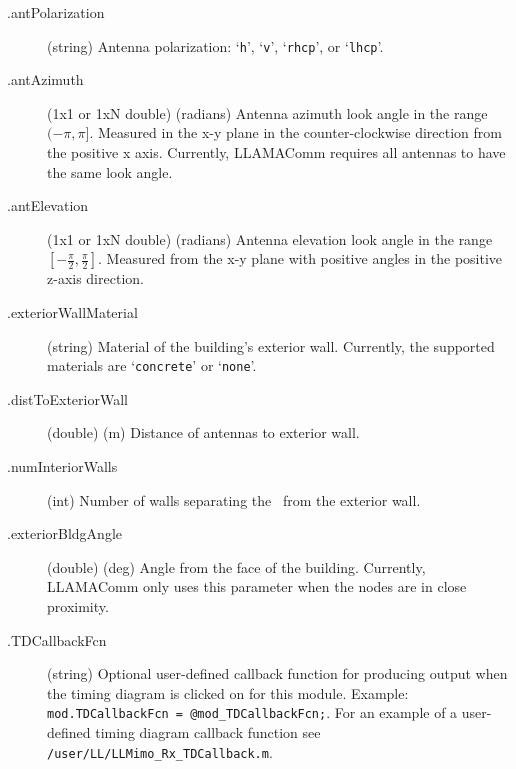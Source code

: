 \begin{description}
\item[.antPolarization] (string) Antenna polarization: `\verb+h+',
`\verb+v+', `\verb+rhcp+', or `\verb+lhcp+'.

\item[.antAzimuth] (1x1 or 1xN double) (radians) Antenna azimuth look angle
in the range $(-\pi, \pi]$. Measured in the x-y plane in the counter-clockwise
direction from the positive x axis.  Currently, LLAMAComm requires all antennas
to have the same look angle.

\item[.antElevation] (1x1 or 1xN double) (radians) Antenna elevation look
angle in the range $[-\frac{\pi}{2}, \frac{\pi}{2}]$.  Measured from the x-y
plane with positive angles in the positive z-axis direction.

\item[.exteriorWallMaterial] (string) Material of the building's exterior
wall.  Currently, the supported materials are `\verb+concrete+' or
`\verb+none+'.

\item[.distToExteriorWall] (double) (m) Distance of antennas to exterior
wall.

\item[.numInteriorWalls] (int) Number of walls separating the \module\ from
the exterior wall.

\item[.exteriorBldgAngle] (double) (deg) Angle from the face of the
building.  Currently, LLAMAComm only uses this parameter when the nodes are in
close proximity.

\item[.TDCallbackFcn] (string) Optional user-defined callback function for producing output when the timing diagram is clicked on for this module.
Example: \verb+mod.TDCallbackFcn = @mod_TDCallbackFcn;+.  For an example of a user-defined timing diagram callback function see \verb+/user/LL/LLMimo_Rx_TDCallback.m+.
\end{description}

